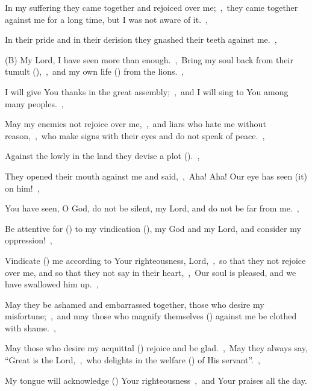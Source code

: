 \documentclass[12pt,twoside,a5paper]{article}
\begin{document}
\begin{normalparskip}
  In my suffering they came together and rejoiced over me;~\sep\ they came together against me for a long time, but I was not aware of it.~\sep

  In their pride and in their derision they gnashed their teeth against me.~\sep

  (B) My Lord, I have seen more than enough.~\sep\ Bring my soul back from their tumult (),~\sep\ and my own life () from the lions.~\sep

  I will give You thanks in the great assembly;~\sep\ and I will sing to You among many peoples.~\sep

  May my enemies not rejoice over me,~\sep\ and liars who hate me without reason,~\sep\ who make signs with their eyes and do not speak of peace.~\sep

  Against the lowly in the land they devise a plot ().~\sep

  They opened their mouth against me and said,~\sep\ Aha! Aha! Our eye has seen (it) on him!~\sep

  You have seen, O God, do not be silent, my Lord, and do not be far from me.~\sep

  Be attentive for () to my vindication (), my God and my Lord, and consider my oppression!~\sep

  Vindicate () me according to Your righteousness, Lord,~\sep\ so that they not rejoice over me, and so that they not say in their heart,~\sep\ Our soul is pleased, and we have swallowed him up.~\sep

  May they be ashamed and embarrassed together, those who desire my misfortune;~\sep\ and may those who magnify themselves () against me be clothed with shame.~\sep

  May those who desire my acquittal () rejoice and be glad.~\sep\ May they always say, ``Great is the Lord,~\sep\ who delights in the welfare () of His servant''.~\sep

  My tongue will acknowledge () Your righteousness~\sep\ and Your praises all the day.
\end{normalparskip}

\end{document}
